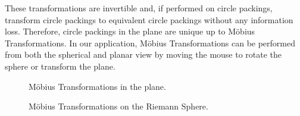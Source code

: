 \documentclass[11pt]{article}
\theoremstyle{definition}
\begin{document}
	These transformations are invertible and, if performed on circle packings, transform circle packings to equivalent circle packings without any information loss. 
	Therefore, circle packings in the plane are unique up to M\"{o}bius Transformations. 
	In our application, M\"{o}bius Transformations can be performed from both the spherical and planar view by moving the mouse to rotate the sphere or transform the plane.
   
    \begin{figure}[h]%
		\centering
		\qquad
		\caption{M\"{o}bius Transformations in the plane.}%
		\label{fig:mobiusplane}%
	\end{figure}

	\begin{figure}[H]%
		\centering
		\qquad
		\caption[]{M\"{o}bius Transformations on the Riemann Sphere.}%
		\label{fig:mobiussphere}%
	\end{figure}
\end{document}
